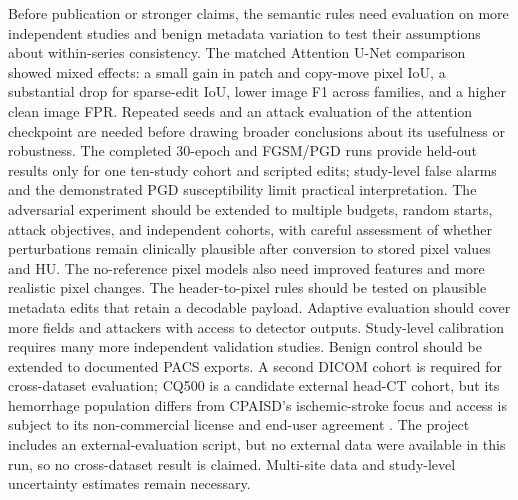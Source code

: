 \documentclass[journal]{IEEEtran}
\begin{document}
  Before publication or stronger claims, the semantic rules need evaluation on more independent studies and benign metadata variation to test their assumptions about within-series consistency. The matched Attention U-Net comparison showed mixed effects: a small gain in patch and copy-move pixel IoU, a substantial drop for sparse-edit IoU, lower image F1 across families, and a higher clean image FPR. Repeated seeds and an attack evaluation of the attention checkpoint are needed before drawing broader conclusions about its usefulness or robustness. The completed 30-epoch and FGSM/PGD runs provide held-out results only for one ten-study cohort and scripted edits; study-level false alarms and the demonstrated PGD susceptibility limit practical interpretation. The adversarial experiment should be extended to multiple budgets, random starts, attack objectives, and independent cohorts, with careful assessment of whether perturbations remain clinically plausible after conversion to stored pixel values and HU. The no-reference pixel models also need improved features and more realistic pixel changes. The header-to-pixel rules should be tested on plausible metadata edits that retain a decodable payload. Adaptive evaluation should cover more fields and attackers with access to detector outputs. Study-level calibration requires many more independent validation studies. Benign control should be extended to documented PACS exports. A second DICOM cohort is required for cross-dataset evaluation; CQ500 is a candidate external head-CT cohort, but its hemorrhage population differs from CPAISD's ischemic-stroke focus and access is subject to its non-commercial license and end-user agreement \cite{linyuh2024}. The project includes an external-evaluation script, but no external data were available in this run, so no cross-dataset result is claimed. Multi-site data and study-level uncertainty estimates remain necessary.
  
\end{document}
